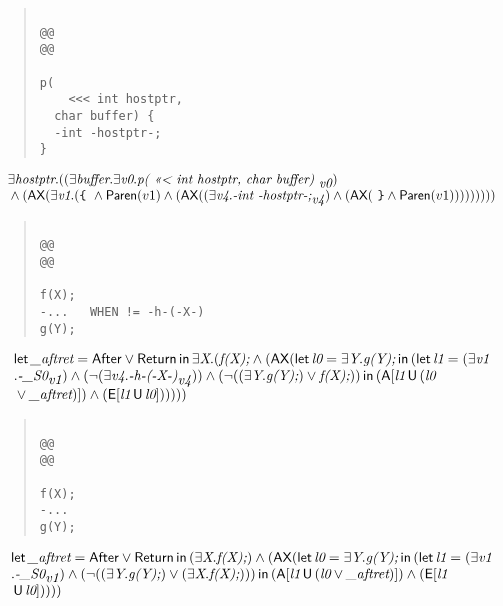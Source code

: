 \documentclass{article}
\newcommand{\U}{\,\mbox{\sf{U}}\,}
\newcommand{\A}{\mbox{\sf{A}}}
\newcommand{\E}{\mbox{\sf{E}}}
\newcommand{\AX}{\mbox{\sf{AX}}}
\newcommand{\mita}[1]{\mbox{\it{{#1}}}}
\newcommand{\msf}[1]{\mbox{\sf{{#1}}}}
\newcommand{\ttlb}{\mbox{\tt \char'173}}
\newcommand{\ttrb}{\mbox{\tt \char'175}}
\begin{document}
\begin{quote}\begin{verbatim}

@@
@@

p(
    <<< int hostptr, 
  char buffer) {
  -int -hostptr-;
}
\end{verbatim}\end{quote}

\[\begin{array}{l}
\exists \mita{hostptr} . ((\exists \mita{buffer} . \exists \mita{v0} . \mita{p(
    <<< int hostptr, 
  char buffer) }_{\mita{v0}})\\\mbox{} \wedge (\AX(\exists \mita{v1} . (\mita{{\ttlb}
  } \wedge \msf{Paren}(v1) \wedge (\AX((\exists \mita{v4} . \mita{-int -hostptr-;}_{\mita{v4}}) \wedge (\AX(\mita{
{\ttrb}} \wedge \msf{Paren}(v1)))))))))
\end{array}\]

\begin{quote}\begin{verbatim}

@@
@@

f(X);
-...   WHEN != -h-(-X-)
g(Y);
\end{verbatim}\end{quote}

\[\begin{array}{l}
\mita{\sf{let}} \, \mita{\_aftret} = \msf{After} \vee \msf{Return} \, \mita{\sf{in}} \, \exists \mita{X} . (\mita{f(X);} \wedge (\AX(\mita{\sf{let}} \, \mita{l0} = \exists \mita{Y} . \mita{g(Y);} \, \mita{\sf{in}} \, (\mita{\sf{let}} \, \mita{l1} = (\exists \mita{v1}\\\mbox{} . \mita{-\_S0}_{\mita{v1}}) \wedge (\neg (\exists \mita{v4} . \mita{-h-(-X-)}_{\mita{v4}})) \wedge (\neg ((\exists \mita{Y} . \mita{g(Y);}) \vee \mita{f(X);})) \, \mita{\sf{in}} \, (\A[\mita{l1} \U (\mita{l0}\\\mbox{} \vee \mita{\_aftret})]
) \wedge (\E[\mita{l1} \U \mita{l0}]
)
)
)))

\end{array}\]

\begin{quote}\begin{verbatim}

@@
@@

f(X);
-...
g(Y);
\end{verbatim}\end{quote}

\[\begin{array}{l}
\mita{\sf{let}} \, \mita{\_aftret} = \msf{After} \vee \msf{Return} \, \mita{\sf{in}} \, (\exists \mita{X} . \mita{f(X);}) \wedge (\AX(\mita{\sf{let}} \, \mita{l0} = \exists \mita{Y} . \mita{g(Y);} \, \mita{\sf{in}} \, (\mita{\sf{let}} \, \mita{l1} = (\exists \mita{v1}\\\mbox{} . \mita{-\_S0}_{\mita{v1}}) \wedge (\neg ((\exists \mita{Y} . \mita{g(Y);}) \vee (\exists \mita{X} . \mita{f(X);}))) \, \mita{\sf{in}} \, (\A[\mita{l1} \U (\mita{l0} \vee \mita{\_aftret})]
) \wedge (\E[\mita{l1}\\\mbox{} \U \mita{l0}]
)
)
))

\end{array}\]
\end{document}
